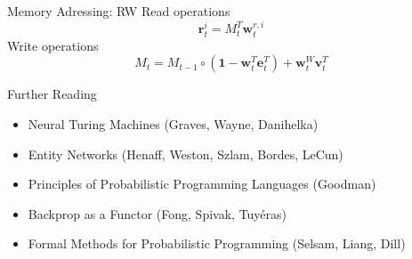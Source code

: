 \documentclass{beamer}
\begin{document}
\begin{frame}{Memory Adressing: RW}
\alert{Read operations}
\[
\pmb{r}_t^i = M_t^T\pmb{w}_t^{r,i}
\]
\pause
\alert{Write operations}
\[
M_t = M_{t-1} \circ (\pmb{1} - \pmb{w}_t^T\pmb{e}_t^T) + \pmb{w}_t^W\pmb{v}_t^T
\]
\end{frame}

\begin{frame}{Further Reading}
	\begin{itemize}
	\item \alert{Neural Turing Machines} (Graves, Wayne, Danihelka)
	\item \alert{Entity Networks} (Henaff, Weston, Szlam, Bordes, LeCun)
	\item \alert{Principles of Probabilistic Programming Languages} (Goodman)
	\item \alert{Backprop as a Functor} (Fong, Spivak, Tuyéras)
	\item \alert{Formal Methods for Probabilistic Programming} (Selsam, Liang, Dill)
	\end{itemize}
\end{frame}
\end{document}
